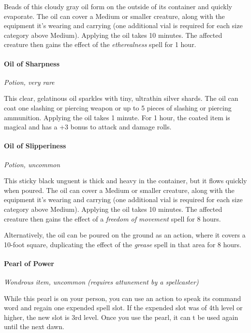 \documentclass[
]{article}
\begin{document}
Beads of this cloudy gray oil form on the outside of its container and
quickly evaporate. The oil can cover a Medium or smaller creature, along
with the equipment it's wearing and carrying (one additional vial is
required for each size category above Medium). Applying the oil takes 10
minutes. The affected creature then gains the effect of the
\emph{etherealness} spell for 1 hour.

\hypertarget{oil-of-sharpness}{%
\paragraph{Oil of Sharpness}\label{oil-of-sharpness}}

\emph{Potion, very rare}

This clear, gelatinous oil sparkles with tiny, ultrathin silver shards.
The oil can coat one slashing or piercing weapon or up to 5 pieces of
slashing or piercing ammunition. Applying the oil takes 1 minute. For 1
hour, the coated item is magical and has a +3 bonus to attack and damage
rolls.

\hypertarget{oil-of-slipperiness}{%
\paragraph{Oil of Slipperiness}\label{oil-of-slipperiness}}

\emph{Potion, uncommon}

This sticky black unguent is thick and heavy in the container, but it
flows quickly when poured. The oil can cover a Medium or smaller
creature, along with the equipment it's wearing and carrying (one
additional vial is required for each size category above Medium).
Applying the oil takes 10 minutes. The affected creature then gains the
effect of a \emph{freedom of movement} spell for 8 hours.

Alternatively, the oil can be poured on the ground as an action, where
it covers a 10-foot square, duplicating the effect of the \emph{grease}
spell in that area for 8 hours.

\hypertarget{pearl-of-power}{%
\paragraph{Pearl of Power}\label{pearl-of-power}}

\emph{Wondrous item, uncommon (requires attunement by a spellcaster)}

While this pearl is on your person, you can use an action to speak its
command word and regain one expended spell slot. If the expended slot
was of 4th level or higher, the new slot is 3rd level. Once you use the
pearl, it can t be used again until the next dawn.
\end{document}

